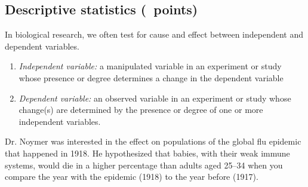 \documentclass[12pt, addpoints, hidelinks]{exam}
\begin{document}
\subsection*{Descriptive statistics (\numpoints\ points)}

In biological research, we often test for cause and effect between
independent and dependent variables.

\begin{enumerate}[label=\textsc{\alph*.}, leftmargin=*]
\item
  \emph{Independent variable:} a manipulated variable in an experiment
  or study whose presence or degree determines a change in the dependent
  variable
\item
  \emph{Dependent variable:} an observed variable in an experiment or
  study whose change(s) are determined by the presence or degree of one
  or more independent variables.
\end{enumerate}

Dr. Noymer was interested in the effect on populations of the global flu
epidemic that happened in 1918. He hypothesized that babies, with their
weak immune systems, would die in a higher percentage than adults aged
25–34 when you compare the year with the epidemic (1918) to the year
before (1917).
\end{document}
